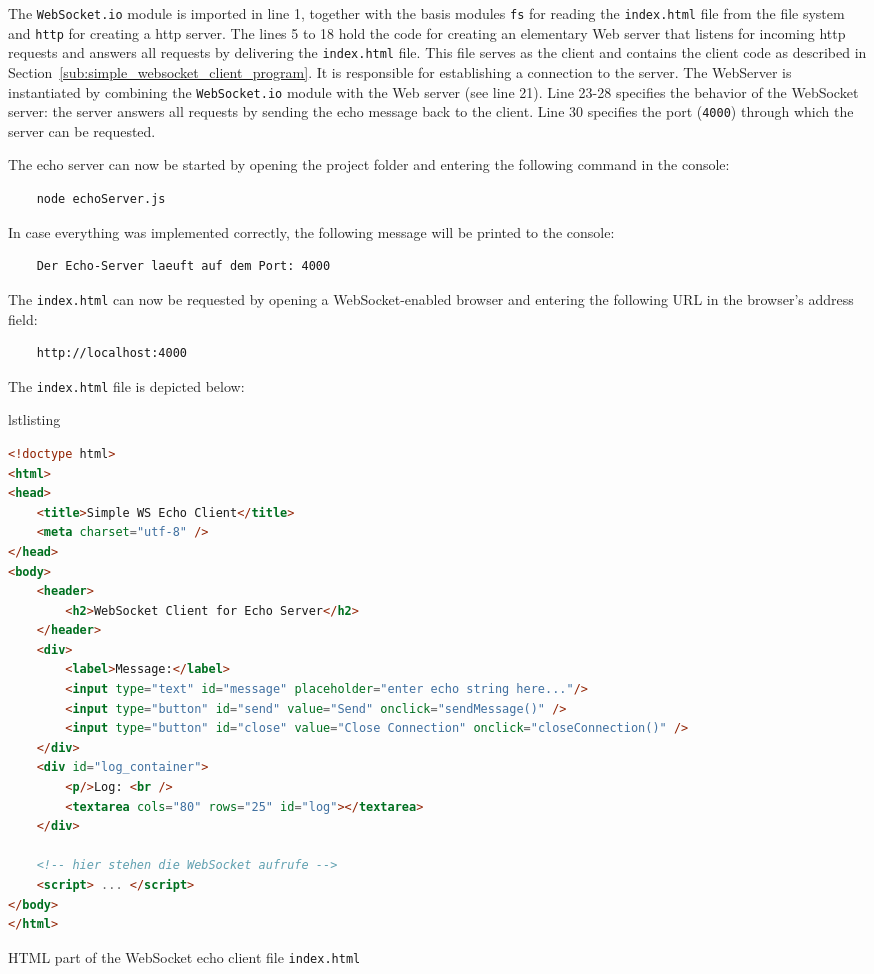 \documentclass[a4paper, justified, notoc]{tufte-handout} %
\makeatletter
\newenvironment{listing}[1][htbp] %
  {\ifvmode\else\unskip\fi\begin{@tufte@float}[#1]{lstlisting}{}}
  {\end{@tufte@float} } %
\makeatother
\begin{document}
The \texttt{WebSocket.io} module is imported in line 1, together with the basis modules \texttt{fs} for reading the \texttt{index.html} file from the file system and \texttt{http} for creating a http server. 
The lines 5 to 18 hold the code for creating an elementary Web server that listens for incoming http requests and answers all requests by delivering the \texttt{index.html} file. This file serves as the client and contains the client code as described in Section~\ref{sub:simple_websocket_client_program}. It is responsible for establishing a connection to the server. The WebServer is instantiated by combining the \texttt{WebSocket.io} module with the Web server (see line 21). Line 23-28 specifies the behavior of the WebSocket server: the server answers all requests by sending the echo message back to the client. Line 30 specifies the port (\texttt{4000}) through which the server can be requested.

The echo server can now be started by opening the project folder and entering the following command in the console:
\begin{Verbatim}
	node echoServer.js
\end{Verbatim}
In case everything was implemented correctly, the following message will be printed to the console:
\begin{Verbatim}
	Der Echo-Server laeuft auf dem Port: 4000
\end{Verbatim}
The \texttt{index.html} can now be requested by opening a WebSocket-enabled browser and entering the following URL in the browser's address field:
\begin{Verbatim}
	http://localhost:4000
\end{Verbatim}
The \texttt{index.html} file is depicted below:
\begin{listing} %
\begin{lstlisting}[language=HTML]
<!doctype html>
<html>
<head>
    <title>Simple WS Echo Client</title>
    <meta charset="utf-8" />
</head>
<body>
    <header>
        <h2>WebSocket Client for Echo Server</h2>
    </header>
    <div>
        <label>Message:</label>
        <input type="text" id="message" placeholder="enter echo string here..."/>
        <input type="button" id="send" value="Send" onclick="sendMessage()" />
        <input type="button" id="close" value="Close Connection" onclick="closeConnection()" />
    </div>
    <div id="log_container">
        <p/>Log: <br />
        <textarea cols="80" rows="25" id="log"></textarea>
    </div>

    <!-- hier stehen die WebSocket aufrufe -->
    <script> ... </script>
</body>
</html>
\end{lstlisting}
	\caption{HTML part of the WebSocket echo client file \texttt{index.html}}
	\label{echo_client_1}
\end{listing}
\end{document}
